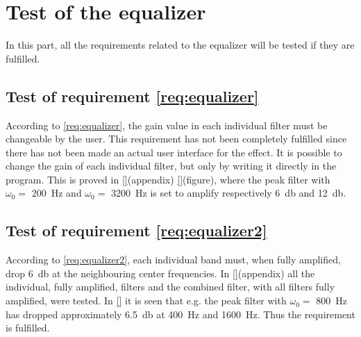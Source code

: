 \section{Test of the equalizer}
In this part, all the requirements related to the equalizer will be tested if they are fulfilled. 


\subsection{Test of requirement \autoref{req:equalizer}}
According to \autoref{req:equalizer}, the gain value in each individual filter must be changeable by the user. This requirement has not been completely fulfilled since there has not been made an actual user interface for the effect. It is possible to change the gain of each individual filter, but only by writing it directly in the program. This is proved in \autoref{}(appendix) \autoref{}(figure), where the peak filter with $\omega_0 =$ \SI{200}{\hertz} and $\omega_0 =$ \SI{3200}{\hertz} is set to amplify respectively \SI{6}{\decibel} and \SI{12}{\decibel}. 




\subsection{Test of requirement \autoref{req:equalizer2}}
According to \autoref{req:equalizer2}, each individual band must, when fully amplified, drop \SI{6}{\decibel} at the neighbouring center frequencies. In \autoref{}(appendix) all the individual, fully amplified, filters and the combined filter, with all filters fully amplified, were tested. In \autoref{}  it is seen that e.g. the peak filter with $\omega_0 =$ \SI{800}{\hertz} has dropped approximately \SI{6.5}{\decibel} at \SI{400}{\hertz} and \SI{1600}{\hertz}. Thus the requirement is fulfilled. 

